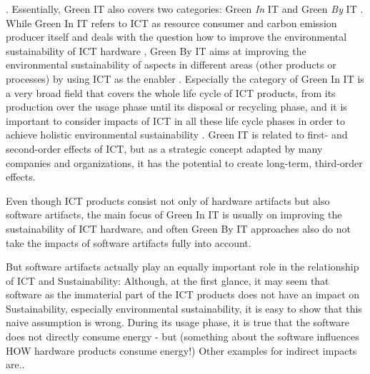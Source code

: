 . Essentially, Green IT also covers two categories: Green \textit{In} IT and Green \textit{By} IT \cite{hilty11}. While Green In IT refers to ICT as resource consumer and carbon emission producer itself and deals with the question how to improve the environmental sustainability of ICT hardware \cite{calero_green_2015}, Green By IT aims at improving the environmental sustainability of aspects in different areas (other products or processes) by using ICT as the enabler \cite{hilty11}. Especially the category of Green In IT is a very broad field that covers the whole life cycle of ICT products, from its production over the usage phase until its disposal or recycling phase, and it is important to consider impacts of ICT in all these life cycle phases in order to achieve holistic environmental sustainability \cite{hilty11}. %
Green IT is related to first- and second-order effects of ICT, but as a strategic concept adapted by many companies and organizations, it has the potential to create long-term, third-order effects. %

Even though ICT products consist not only of hardware artifacts but also software artifacts, the main focus of Green In IT is usually on improving the sustainability of ICT hardware, %
and often Green By IT approaches also do not take the impacts of software artifacts fully into account. %

But software artifacts actually play an equally important role in the relationship of ICT and Sustainability: %
Although, at the first glance, it may seem that software as the immaterial %
part of the ICT products does not have an impact on Sustainability, especially environmental sustainability, it is easy to show that this naive assumption is wrong. %
During its usage phase, it is true that the software does not directly consume energy - but (something about the software influences HOW hardware products consume energy!) %
Other examples for indirect impacts are.. 

